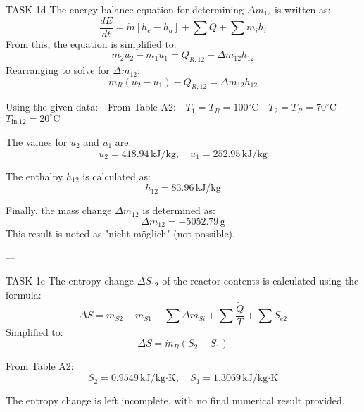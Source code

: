 TASK 1d  
The energy balance equation for determining \( \Delta m_{12} \) is written as:  
\[
\frac{dE}{dt} = \dot{m} \left[ h_e - h_a \right] + \sum \dot{Q} + \sum \dot{m}_i h_i
\]  
From this, the equation is simplified to:  
\[
m_{2} u_{2} - m_{1} u_{1} = Q_{R,12} + \Delta m_{12} h_{12}
\]  
Rearranging to solve for \( \Delta m_{12} \):  
\[
m_{R} \left( u_{2} - u_{1} \right) - Q_{R,12} = \Delta m_{12} h_{12}
\]  

Using the given data:  
- From Table A2:  
  - \( T_{1} = T_{R} = 100^\circ\text{C} \)  
  - \( T_{2} = T_{R} = 70^\circ\text{C} \)  
- \( T_{\text{in,12}} = 20^\circ\text{C} \)  

The values for \( u_{2} \) and \( u_{1} \) are:  
\[
u_{2} = 418.94 \, \text{kJ/kg}, \quad u_{1} = 252.95 \, \text{kJ/kg}
\]  

The enthalpy \( h_{12} \) is calculated as:  
\[
h_{12} = 83.96 \, \text{kJ/kg}
\]  

Finally, the mass change \( \Delta m_{12} \) is determined as:  
\[
\Delta m_{12} = -5052.79 \, \text{g}
\]  
This result is noted as "nicht möglich" (not possible).  

---

TASK 1e  
The entropy change \( \Delta S_{12} \) of the reactor contents is calculated using the formula:  
\[
\Delta S = m_{S2} - m_{S1} - \sum \Delta m_{Si} + \sum \frac{\dot{Q}}{T} + \sum S_{e2}
\]  
Simplified to:  
\[
\Delta S = \dot{m}_{R} \left( S_{2} - S_{1} \right)
\]  

From Table A2:  
\[
S_{2} = 0.9549 \, \text{kJ/kg·K}, \quad S_{1} = 1.3069 \, \text{kJ/kg·K}
\]  

The entropy change is left incomplete, with no final numerical result provided.
